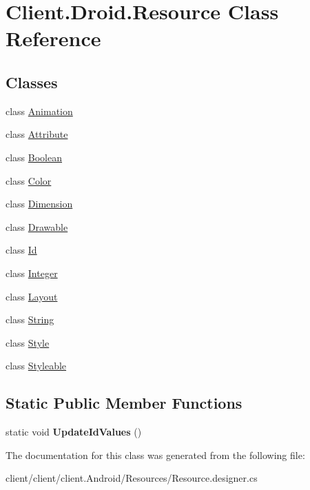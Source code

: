 \hypertarget{classClient_1_1Droid_1_1Resource}{}\section{Client.\+Droid.\+Resource Class Reference}
\label{classClient_1_1Droid_1_1Resource}
\subsection*{Classes}
\begin{DoxyCompactItemize}
\item 
class \hyperlink{classClient_1_1Droid_1_1Resource_1_1Animation}{Animation}
\item 
class \hyperlink{classClient_1_1Droid_1_1Resource_1_1Attribute}{Attribute}
\item 
class \hyperlink{classClient_1_1Droid_1_1Resource_1_1Boolean}{Boolean}
\item 
class \hyperlink{classClient_1_1Droid_1_1Resource_1_1Color}{Color}
\item 
class \hyperlink{classClient_1_1Droid_1_1Resource_1_1Dimension}{Dimension}
\item 
class \hyperlink{classClient_1_1Droid_1_1Resource_1_1Drawable}{Drawable}
\item 
class \hyperlink{classClient_1_1Droid_1_1Resource_1_1Id}{Id}
\item 
class \hyperlink{classClient_1_1Droid_1_1Resource_1_1Integer}{Integer}
\item 
class \hyperlink{classClient_1_1Droid_1_1Resource_1_1Layout}{Layout}
\item 
class \hyperlink{classClient_1_1Droid_1_1Resource_1_1String}{String}
\item 
class \hyperlink{classClient_1_1Droid_1_1Resource_1_1Style}{Style}
\item 
class \hyperlink{classClient_1_1Droid_1_1Resource_1_1Styleable}{Styleable}
\end{DoxyCompactItemize}
\subsection*{Static Public Member Functions}
\begin{DoxyCompactItemize}
\item 
\hypertarget{classClient_1_1Droid_1_1Resource_a30557bbfa15f0673bedd541007c3156d}{}static void {\bfseries Update\+Id\+Values} ()\label{classClient_1_1Droid_1_1Resource_a30557bbfa15f0673bedd541007c3156d}

\end{DoxyCompactItemize}


The documentation for this class was generated from the following file\+:\begin{DoxyCompactItemize}
\item 
client/client/client.\+Android/\+Resources/Resource.\+designer.\+cs\end{DoxyCompactItemize}
